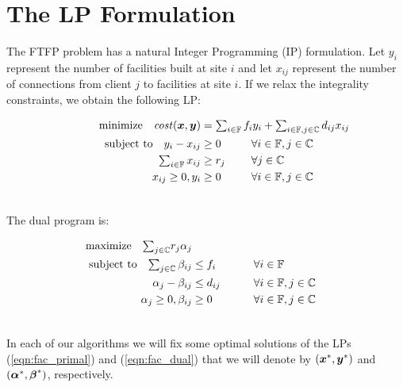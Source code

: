 \section{The LP Formulation}\label{sec: the lp formulation}

The FTFP problem has a natural Integer Programming (IP)
formulation. Let $y_i$ represent the number of facilities
built at site $i$ and let $x_{ij}$ represent the number of
connections from client $j$ to facilities at site $i$. If we
relax the integrality constraints, we obtain the following LP:

\begin{alignat}{3}
  \textrm{minimize} \quad \cost(\bfx,\bfy) &= \textstyle{\sum_{i\in \sitesset}f_iy_i 
								+ \sum_{i\in \sitesset, j\in \clientset}d_{ij}x_{ij}}\label{eqn:fac_primal}\hspace{-1.5in}&&
									\\ \notag
  \textrm{subject to}\quad y_i - x_{ij} &\geq 0 			&\quad 		&\forall i\in \sitesset, j\in \clientset 
									\\ \notag
     \textstyle{\sum_{i\in \sitesset} x_{ij}} &\geq r_j  &			&\forall j\in \clientset
 									\\ \notag
  	  x_{ij} \geq 0, y_i &\geq 0 						& 			&\forall i\in \sitesset, j\in \clientset 
  									\\ \notag
\end{alignat}


\noindent
The dual program is:

\begin{alignat}{3}
  \textrm{maximize}\quad \textstyle{\sum_{j\in \mathbb{C}}} r_j\alpha_j&\label{eqn:fac_dual}  
     						\\ \notag
  \textrm{subject to} \quad \textstyle{
    \sum_{j\in \mathbb{C}}\beta_{ij}} &\leq f_i  &\quad\quad			&\forall i \in \mathbb{F}  
							\\ \notag
  \alpha_{j} - \beta_{ij} 	&\leq  d_{ij}       &                 & \forall i\in \mathbb{F}, j\in \mathbb{C} 
							\\ \notag
  \alpha_j \geq 0, \beta_{ij} &\geq 0           &            & \forall i\in \mathbb{F}, j\in \mathbb{C}
  							\\ \notag
\end{alignat}

In each of our algorithms we will fix some optimal
solutions of the LPs (\ref{eqn:fac_primal}) and (\ref{eqn:fac_dual})
that we will denote by $(\boldsymbol{x}^\ast, \boldsymbol{y}^\ast)$ and
$(\boldsymbol{\alpha}^\ast,\boldsymbol{\beta}^\ast)$, respectively.

